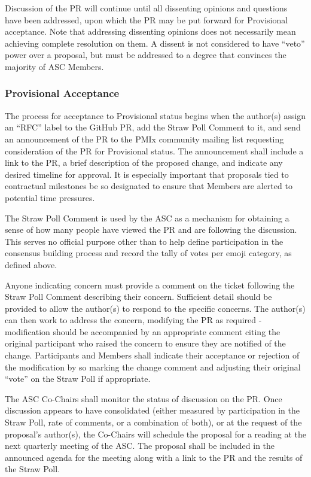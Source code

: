 \documentclass{article}
\begin{document}
Discussion of the PR will continue until all dissenting opinions and
questions have been addressed, upon which the PR may be put forward for
Provisional acceptance. Note that addressing dissenting opinions does
not necessarily mean achieving complete resolution on them. A dissent is
not considered to have ``veto'' power over a proposal, but must be
addressed to a degree that convinces the majority of ASC Members.

\hypertarget{provisional-acceptance}{%
\subsubsection{Provisional Acceptance}%
\label{provisional-acceptance}}

The process for acceptance to Provisional status begins when the
author(s) assign an ``RFC'' label to the GitHub PR, add the
Straw Poll Comment to it, and send an announcement of the
PR to the PMIx community mailing list requesting consideration of the PR
for Provisional status. The announcement shall include a link to the PR,
a brief description of the proposed change, and indicate any desired
timeline for approval. It is especially important that proposals tied to
contractual milestones be so designated to ensure that Members are
alerted to potential time pressures.

The Straw Poll Comment is used by the ASC as a mechanism for
obtaining a sense of how many people have viewed the PR and are
following the discussion. This serves no official purpose other than to
help define participation in the consensus building process and record
the tally of votes per emoji category, as defined above.

Anyone indicating concern must provide a comment on the ticket following
the Straw Poll Comment describing their concern. Sufficient
detail should be provided to allow the author(s) to respond to the
specific concerns. The author(s) can then work to address the concern,
modifying the PR as required - modification should be accompanied by an
appropriate comment citing the original participant who raised the
concern to ensure they are notified of the change. Participants and
Members shall indicate their acceptance or rejection of the modification
by so marking the change comment and adjusting their original ``vote''
on the Straw Poll if appropriate.

The ASC Co-Chairs shall monitor the status of discussion on the PR. Once
discussion appears to have consolidated (either measured by
participation in the Straw Poll, rate of comments, or a combination of
both), or at the request of the proposal's author(s), the Co-Chairs will
schedule the proposal for a reading at the next quarterly meeting of the
ASC. The proposal shall be included in the announced agenda for the
meeting along with a link to the PR and the results of the Straw Poll.
\end{document}
